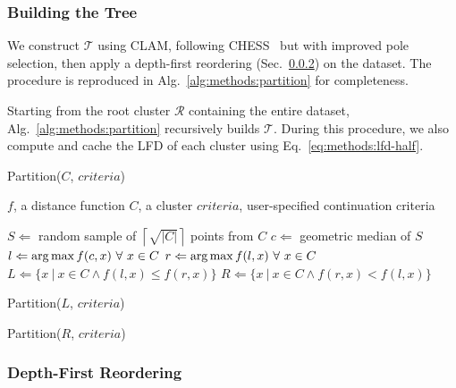 \subsubsection{Building the Tree}
\label{sec:methods:clustering:building-the-tree}

We construct $\mathcal{T}$ using CLAM, following CHESS~\cite{ishaq2019clustered} but with improved pole selection, then apply a depth-first reordering (Sec.~\ref{sec:methods:clustering:depth-first-reordering}) on the dataset.
The procedure is reproduced in Alg.~\ref{alg:methods:partition} for completeness.

Starting from the root cluster $\mathcal{R}$ containing the entire dataset, Alg.~\ref{alg:methods:partition} recursively builds $\mathcal{T}$.
During this procedure, we also compute and cache the LFD of each cluster using Eq.~\ref{eq:methods:lfd-half}.

\begin{algorithm} %
    \caption{Partition($C$, $criteria$)} %
    \label{alg:methods:partition} %
    \begin{algorithmic} %
    \REQUIRE $f$, a distance function
    \REQUIRE $C$, a cluster
    \REQUIRE $criteria$, user-specified continuation criteria

    \STATE $S \Leftarrow$ random sample of $\left\lceil \sqrt{|C|} \right\rceil$ points from $C$
    \STATE $c \Leftarrow$ geometric median of $S$
    \STATE $l \Leftarrow \operatorname*{arg\,max} f(c, x) \ \forall \ x \in C$
    \STATE $r \Leftarrow \argmax f(l, x) \ \forall \ x \in C$
    \STATE $L \Leftarrow \{x \ | \ x \in C \land f(l, x) \le f(r, x)\}$
    \STATE $R \Leftarrow \{x \ | \ x \in C \land f(r, x) < f(l, x)\}$

        \STATE Partition($L$, $criteria$)
    \ENDIF

        \STATE Partition($R$, $criteria$)
    \ENDIF
\end{algorithmic}
\end{algorithm}


\subsubsection{Depth-First Reordering}
\label{sec:methods:clustering:depth-first-reordering}


